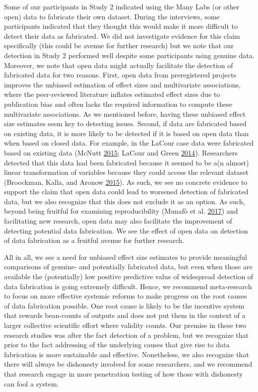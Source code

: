\documentclass[a5paper]{book}
\begin{document}
Some of our participants in Study 2 indicated using the Many Labs (or
other open) data to fabricate their own dataset. During the interviews,
some participants indicated that they thought this would make it more
difficult to detect their data as fabricated. We did not investigate
evidence for this claim specifically (this could be avenue for further
research) but we note that our detection in Study 2 performed well
despite some participants using genuine data. Moreover, we note that
open data might actually facilitate the detection of fabricated data for
two reasons. First, open data from preregistered projects improves the
unbiased estimation of effect sizes and multivariate associations, where
the peer-reviewed literature inflates estimated effect sizes due to
publication bias and often lacks the required information to compute
these multivariate associations. As we mentioned before, having these
unbiased effect size estimates seem key to detecting issues. Second, if
data are fabricated based on existing data, it is more likely to be
detected if it is based on open data than when based on closed data. For
example, in the LaCour case data were fabricated based on existing data
(McNutt \protect\hyperlink{ref-doi:10.1126ux2fscience.aac6184}{2015};
LaCour and Green
\protect\hyperlink{ref-doi:10.1126ux2fscience.1256151}{2014}).
Researchers detected that this data had been fabricated because it
seemed to be a(n almost) linear transformation of variables because they
could access the relevant dataset (Broockman, Kalla, and Aronow
\protect\hyperlink{ref-lg-irreg}{2015}). As such, we see no concrete
evidence to support the claim that open data could lead to worsened
detection of fabricated data, but we also recognize that this does not
exclude it as an option. As such, beyond being fruitful for examining
reproducibility (Munafò et al.
\protect\hyperlink{ref-doi:10.1038ux2fs41562-016-0021}{2017}) and
facilitating new research, open data may also facilitate the improvement
of detecting potential data fabrication. We see the effect of open data
on detection of data fabrication as a fruitful avenue for further
research.

All in all, we see a need for unbiased effect size estimates to provide
meaningful comparisons of genuine- and potentially fabricated data, but
even when those are available the (potentially) low positive predictive
value of widespread detection of data fabrication is going extremely
difficult. Hence, we recommend meta-research to focus on more effective
systemic reforms to make progress on the root causes of data fabrication
possible. One root cause is likely to be the incentive system that
rewards bean-counts of outputs and does not put them in the context of a
larger collective scientific effort where validity counts. Our premise
in these two research studies was after the fact detection of a problem,
but we recognize that prior to the fact addressing of the underlying
causes that give rise to data fabrication is more sustainable and
effective. Nonetheless, we also recognize that there will always be
dishonesty involved for some researchers, and we recommend that research
engage in more penetration testing of how those with dishonesty can fool
a system.
\end{document}
